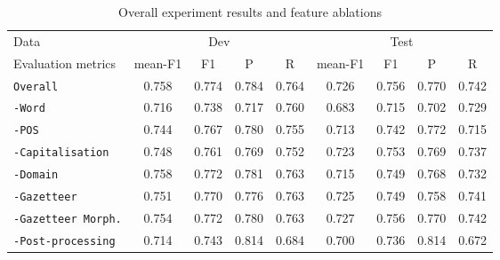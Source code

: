 \documentclass[11pt]{article}
\newcommand{\feature}[1]{\texttt{#1}\xspace}
\newcommand{\tabref}[2][]{Table#1 \ref{#2}}
\begin{document}
\begin{table*}[!htbp]
\begin{center}
\begin{tabular}{lcccccccc}
\toprule
Data                                         & \multicolumn{4}{c}{Dev}             & \multicolumn{4}{c}{Test}        \\
\cmidrule{2-9}
Evaluation metrics                           & mean-F1 & F1    & P     & R         & mean-F1 & F1    & P     & R     \\ 
\midrule
\feature{Overall}                            & 0.758   & 0.774 & 0.784 & 0.764     & 0.726   & 0.756 & 0.770 & 0.742 \\
\hline
\feature{-Word}                              & 0.716   & 0.738 & 0.717 & 0.760     & 0.683   & 0.715 & 0.702 & 0.729 \\
\feature{-POS}                               & 0.744   & 0.767 & 0.780 & 0.755     & 0.713   & 0.742 & 0.772 & 0.715 \\
\feature{-Capitalisation}                    & 0.748   & 0.761 & 0.769 & 0.752     & 0.723   & 0.753 & 0.769 & 0.737 \\
\feature{-Domain}                            & 0.758   & 0.772 & 0.781 & 0.763     & 0.715   & 0.749 & 0.768 & 0.732 \\
\feature{-Gazetteer}                         & 0.751   & 0.770 & 0.776 & 0.763     & 0.725   & 0.749 & 0.758 & 0.741 \\
\feature{-Gazetteer Morph.}                  & 0.754   & 0.772 & 0.780 & 0.763     & 0.727   & 0.756 & 0.770 & 0.742 \\
\feature{-Post-processing}                   & 0.714   & 0.743 & 0.814 & 0.684     & 0.700   & 0.736 & 0.814 & 0.672 \\
\bottomrule
\end{tabular}
\end{center}
\caption{Overall experiment results and feature ablations}
\label{tab:fea_exp}
\end{table*}

\end{document}

